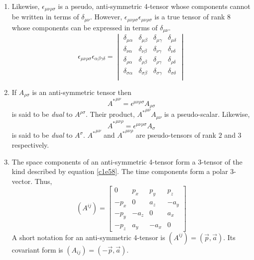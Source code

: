 \begin{enumerate}
\item Likewise, $\epsilon_{\mu\nu\rho\sigma}$ is a pseudo, anti-symmetric
4-tensor whose components cannot be written in terms of $\delta_{\mu\nu}$. 
However, $\epsilon_{\mu\nu\rho\sigma}\epsilon_{\mu\nu\rho\sigma}$ is a true 
tensor of rank $8$ whose components can be expressed in terms of 
$\delta_{\mu\nu}$.
\begin{equation}\label{c1e61}
\epsilon_{\mu\nu\rho\sigma}\epsilon_{\alpha\beta\gamma\delta} = \begin{vmatrix}
\delta_{\mu\alpha} & \delta_{\mu\beta} & \delta_{\mu\gamma} & \delta_{\mu\delta} \\
\delta_{\nu\alpha} & \delta_{\nu\beta} & \delta_{\nu\gamma} & \delta_{\nu\delta} \\
\delta_{\rho\alpha} & \delta_{\rho\beta} & \delta_{\rho\gamma} & \delta_{\rho\delta} \\
\delta_{\sigma\alpha} & \delta_{\sigma\beta} & \delta_{\sigma\gamma} & \delta_{\sigma\delta} \\
\end{vmatrix}
\end{equation}

\item If $A_{\rho\sigma}$ is an anti-symmetric tensor then
\begin{equation}\label{c1e62}
{A^\ast}^{\mu\nu} = \epsilon^{\mu\nu\rho\sigma}A_{\rho\sigma}
\end{equation}
is said to be \emph{dual} to $A^{\rho\sigma}$. Their product, ${A^\ast}^{\mu\nu}
A_{\mu\nu}$ is a pseudo-scalar. Likewise, 
\begin{equation}\label{c1e63}
{A^\ast}^{\mu\nu\rho} = \epsilon^{\mu\nu\rho\sigma}A_{\sigma}
\end{equation}
is said to be \emph{dual} to $A^\sigma$. ${A^\ast}^{\mu\nu}$ and 
${A^\ast}^{\mu\nu\rho}$ are pseudo-tensors of rank $2$ and $3$ respectively.

\item The space components of an anti-symmetric 4-tensor form a 3-tensor of the 
kind described by equation \eqref{c1e58}. The time components form a polar 
3-vector. Thus,
\begin{equation}\label{c1e64}
(A^{ij}) = \begin{bmatrix} 0 & p_x & p_y & p_z \\
-p_x & 0 & a_z & -a_y \\
-p_y & -a_z & 0 & a_x \\
-p_z & a_y & -a_x & 0
\end{bmatrix}
\end{equation}
A short notation for an anti-symmetric 4-tensor is $(A^{ij}) = (\vec{p}, 
\vec{a})$.  Its covariant form is $(A_{ij}) = (-\vec{p}, \vec{a})$.


\end{enumerate}
